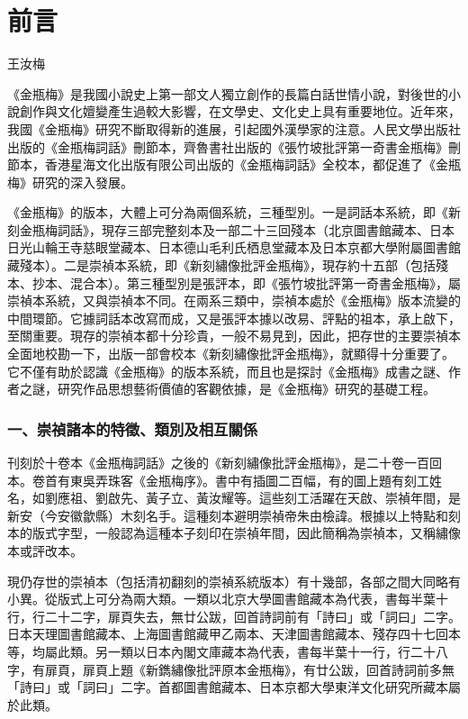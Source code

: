 \chapter*{前言}

\begin{declareqianyan}
王汝梅\qquad\ 
\end{declareqianyan}	

《金瓶梅》是我國小說史上第一部文人獨立創作的長篇白話世情小說，對後世的小說創作與文化嬗變產生過較大影響，在文學史、文化史上具有重要地位。近年來，我國《金瓶梅》研究不斷取得新的進展，引起國外漢學家的注意。人民文學出版社出版的《金瓶梅詞話》刪節本，齊魯書社出版的《張竹坡批評第一奇書金瓶梅》刪節本，香港星海文化出版有限公司出版的《金瓶梅詞話》全校本，都促進了《金瓶梅》研究的深入發展。

《金瓶梅》的版本，大體上可分為兩個系統，三種型別。一是詞話本系統，即《新刻金瓶梅詞話》，現存三部完整刻本及一部二十三回殘本（北京圖書館藏本、日本日光山輪王寺慈眼堂藏本、日本德山毛利氏栖息堂藏本及日本京都大學附屬圖書館藏殘本）。二是崇禎本系統，即《新刻繡像批評金瓶梅》，現存約十五部（包括殘本、抄本、混合本）。第三種型別是張評本，即《張竹坡批評第一奇書金瓶梅》，屬崇禎本系統，又與崇禎本不同。在兩系三類中，崇禎本處於《金瓶梅》版本流變的中間環節。它據詞話本改寫而成，又是張評本據以改易、評點的祖本，承上啟下，至關重要。現存的崇禎本都十分珍貴，一般不易見到，因此，把存世的主要崇禎本全面地校勘一下，出版一部會校本《新刻繡像批評金瓶梅》，就顯得十分重要了。它不僅有助於認識《金瓶梅》的版本系統，而且也是探討《金瓶梅》成書之謎、作者之謎，研究作品思想藝術價値的客觀依據，是《金瓶梅》研究的基礎工程。

\subsection*{一、崇禎諸本的特徵、類別及相互關係}

刊刻於十卷本《金瓶梅詞話》之後的《新刻繡像批評金瓶梅》，是二十卷一百回本。卷首有東吳弄珠客《金瓶梅序》。書中有插圖二百幅，有的圖上題有刻工姓名，如劉應祖、劉啟先、黃子立、黃汝耀等。這些刻工活躍在天啟、崇禎年間，是新安（今安徽歙縣）木刻名手。這種刻本避明崇禎帝朱由檢諱。根據以上特點和刻本的版式字型，一般認為這種本子刻印在崇禎年間，因此簡稱為崇禎本，又稱繡像本或評改本。

現仍存世的崇禎本（包括清初翻刻的崇禎系統版本）有十幾部，各部之間大同略有小異。從版式上可分為兩大類。一類以北京大學圖書館藏本為代表，書每半葉十行，行二十二字，扉頁失去，無廿公跋，回首詩詞前有「詩曰」或「詞曰」二字。日本天理圖書館藏本、上海圖書館藏甲乙兩本、天津圖書館藏本、殘存四十七回本等，均屬此類。另一類以日本內閣文庫藏本為代表，書每半葉十一行，行二十八字，有扉頁，扉頁上題《新鐫繡像批評原本金瓶梅》，有廿公跋，回首詩詞前多無 「詩曰」或「詞曰」二字。首都圖書館藏本、日本京都大學東洋文化研究所藏本屬於此類。

